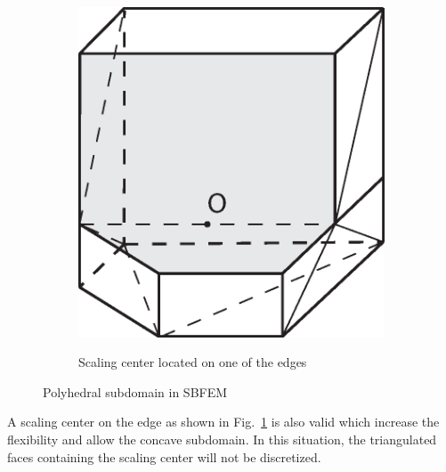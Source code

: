 \begin{figure}
\begin{subfigure}[b]{0.48\linewidth}
{            \includegraphics{octree/images/sbfem3d_b.eps}
        }
        \caption{Scaling center located on one of the edges}
        \label{oct_fig:sbfem_intro_b}
    \end{subfigure}
    \caption[Polyhedral SBFEM subdomain in 3D]{Polyhedral subdomain in SBFEM}
    \label{oct_fig:sbfem_intro_a}
\end{figure}
%
A scaling center on the edge as shown in Fig.~\ref{oct_fig:sbfem_intro_b} is also valid which increase the flexibility and allow the concave subdomain.
In this situation, the triangulated faces containing the scaling center will not be discretized.

